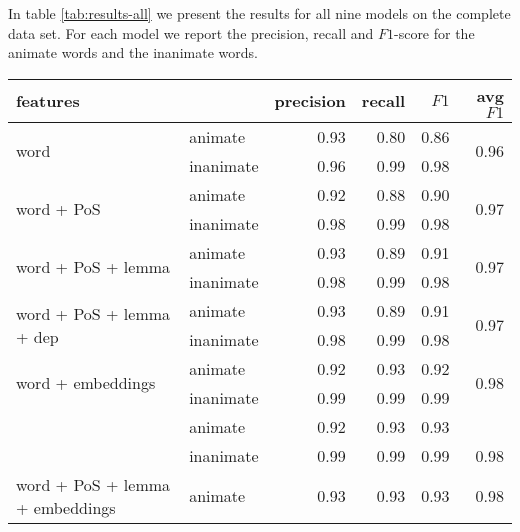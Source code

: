\documentclass[a4paper,UKenglish]{oasics}
\begin{document}
In table \ref{tab:results-all} we present the results for all nine
models on the complete data set. For each model we report the
precision, recall and $F1$-score for the animate words and the
inanimate words.

\begin{table}
\centering
\begin{tabular}{llrrrr}
\toprule
features                                                 &           & precision & recall & $F1$ & avg $F1$              \\ \midrule
\multirow{2}{*}{word}                                    & animate   & 0.93      & 0.80   & 0.86 & \multirow{2}{*}{0.96} \\
                                                         & inanimate & 0.96      & 0.99   & 0.98 &                       \\
\multirow{2}{*}{word + PoS}                              & animate   & 0.92      & 0.88   & 0.90 & \multirow{2}{*}{0.97} \\
                                                         & inanimate & 0.98      & 0.99   & 0.98 &                       \\
\multirow{2}{*}{word + PoS + lemma}                      & animate   & 0.93      & 0.89   & 0.91 & \multirow{2}{*}{0.97} \\
                                                         & inanimate & 0.98      & 0.99   & 0.98 &                       \\
\multirow{2}{*}{word + PoS + lemma + dep}                & animate   & 0.93      & 0.89   & 0.91 & \multirow{2}{*}{0.97} \\
                                                         & inanimate & 0.98      & 0.99   & 0.98 &                       \\
\multirow{2}{*}{word + embeddings}                       & animate   & 0.92      & 0.93   & 0.92 & \multirow{2}{*}{0.98} \\
                                                         & inanimate & 0.99      & 0.99   & 0.99 &                       \\
\rowcolor{Gray}                                          & animate   & 0.92      & 0.93   & 0.93 &                       \\
\rowcolor{Gray}\multirow{-2}{*}{word + PoS + embeddings} & inanimate & 0.99      & 0.99   & 0.99 & \multirow{-2}{*}{0.98}\\
\multirow{2}{*}{word + PoS + lemma + embeddings}         & animate   & 0.93      & 0.93   & 0.93 & \multirow{2}{*}{0.98} \\

\end{tabular}
\end{table}
\end{document}
